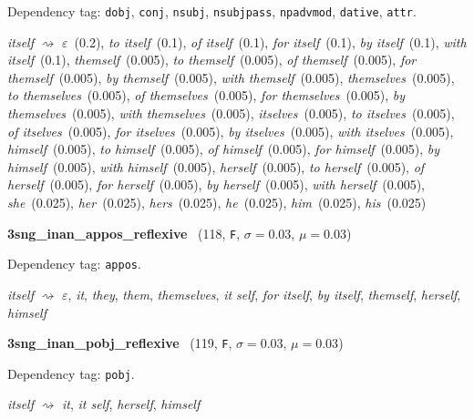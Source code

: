 \documentclass[11pt]{article}
\newenvironment{desc}{%
	\list{}{%
		\parsep 0.25em
		\topsep 0.25em
		\leftmargin 1em
		\rightmargin 0em
	}
	\item\relax
	\sloppy
}{%
	\endlist
}
\newcommand{\attr}[4]{%
	(#1, \texttt{#2}, $\sigma=#3$, $\mu=#4$)
}
\begin{document}
\begin{desc}
	Dependency tag:
	\texttt{dobj},
	\texttt{conj},
	\texttt{nsubj},
	\texttt{nsubjpass},
	\texttt{npadvmod},
	\texttt{dative},
	\texttt{attr}.

	\textit{itself}
	$\rightsquigarrow$
	\textit{$\varepsilon$}~(0.2),
	\textit{to itself}~(0.1),
	\textit{of itself}~(0.1),
	\textit{for itself}~(0.1),
	\textit{by itself}~(0.1),
	\textit{with itself}~(0.1),
	\textit{themself}~(0.005),
	\textit{to themself}~(0.005),
	\textit{of themself}~(0.005),
	\textit{for themself}~(0.005),
	\textit{by themself}~(0.005),
	\textit{with themself}~(0.005),
	\textit{themselves}~(0.005),
	\textit{to themselves}~(0.005),
	\textit{of themselves}~(0.005),
	\textit{for themselves}~(0.005),
	\textit{by themselves}~(0.005),
	\textit{with themselves}~(0.005),
	\textit{itselves}~(0.005),
	\textit{to itselves}~(0.005),
	\textit{of itselves}~(0.005),
	\textit{for itselves}~(0.005),
	\textit{by itselves}~(0.005),
	\textit{with itselves}~(0.005),
	\textit{himself}~(0.005),
	\textit{to himself}~(0.005),
	\textit{of himself}~(0.005),
	\textit{for himself}~(0.005),
	\textit{by himself}~(0.005),
	\textit{with himself}~(0.005),
	\textit{herself}~(0.005),
	\textit{to herself}~(0.005),
	\textit{of herself}~(0.005),
	\textit{for herself}~(0.005),
	\textit{by herself}~(0.005),
	\textit{with herself}~(0.005),
	\textit{she}~(0.025),
	\textit{her}~(0.025),
	\textit{hers}~(0.025),
	\textit{he}~(0.025),
	\textit{him}~(0.025),
	\textit{his}~(0.025)
\end{desc}

\noindent
\textbf{3sng\_inan\_appos\_reflexive}~\attr{118}{F}{0.03}{0.03}

\begin{desc}
	Dependency tag: \texttt{appos}.

	\textit{itself}
	$\rightsquigarrow$
	\textit{$\varepsilon$},
	\textit{it},
	\textit{they},
	\textit{them},
	\textit{themselves},
	\textit{it self},
	\textit{for itself},
	\textit{by itself},
	\textit{themself},
	\textit{herself},
	\textit{himself}
\end{desc}

\noindent
\textbf{3sng\_inan\_pobj\_reflexive}~\attr{119}{F}{0.03}{0.03}

\begin{desc}
	Dependency tag: \texttt{pobj}.

	\textit{itself}
	$\rightsquigarrow$
	\textit{it},
	\textit{it self},
	\textit{herself},
	\textit{himself}
\end{desc}
\end{document}
